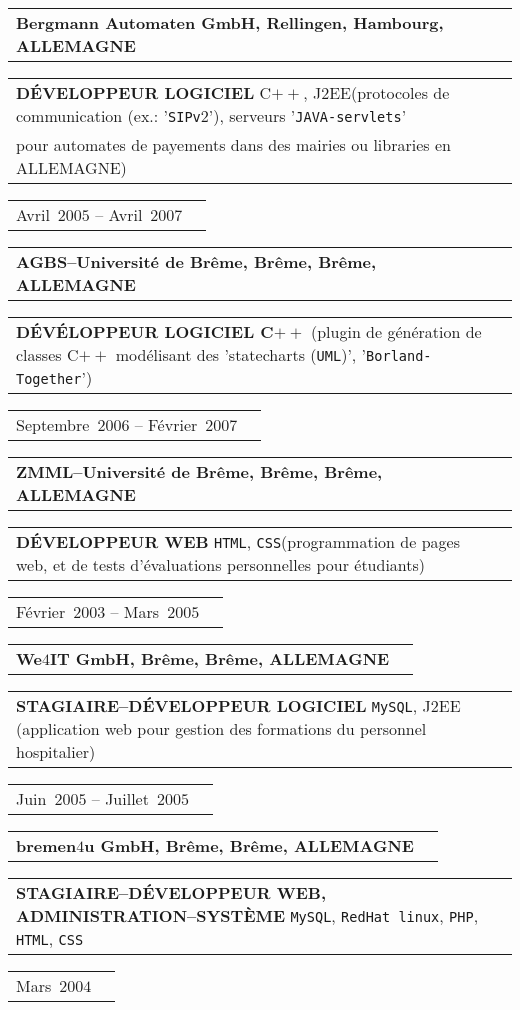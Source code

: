 \documentclass[9pt,a4paper]{article} %
\makeatletter
\newcommand{\headerrow}[2]
{\begin{tabular*}{\linewidth}{l@{\extracolsep{\fill}}r}
	#1 &
	#2 \\
\end{tabular*}}
\newcommand{\headerrowONE}[1]{\headerrow{#1}{}}
\newcommand{\cplusplus}{C$++$\xspace}
\newcommand{\jtwoee}{J$2$EE\xspace}
\newcommand{\css}{\texttt{CSS}\xspace}
\newcommand{\php}{\texttt{PHP}\xspace}
\newcommand{\redhat}{\texttt{RedHat~linux}\xspace}
\newcommand{\mysql}{\texttt{MySQL}\xspace}
\newcommand{\html}{\texttt{HTML}\xspace}
\newcommand{\cvitemdate}[2]{#1~$#2$\xspace}
\newcommand{\cvitempositionheld}[1]{\textbf{#1}\xspace}
\makeatother
\begin{document}
\vspace{0.3em}

\headerrowONE{\textbf{Bergmann Automaten GmbH, Rellingen, Hambourg, ALLEMAGNE}}	
\headerrowONE{\cvitempositionheld{DÉVELOPPEUR LOGICIEL} \cplusplus, \jtwoee (protocoles de
communication (ex.: '\texttt{SIPv$2$}'), serveurs '\texttt{JAVA-servlets}'\\
 pour automates de payements dans des mairies ou libraries en ALLEMAGNE)}
\headerrowONE{\cvitemdate{Avril}{2005} -- \cvitemdate{Avril}{2007}}	
	
\vspace{0.3em}

\headerrowONE{\textbf{AGBS--Université de Brême, Brême, Brême, ALLEMAGNE}}	
\headerrowONE{\cvitempositionheld{DÉVÉLOPPEUR LOGICIEL \cplusplus} (plugin de 
génération de classes \cplusplus modélisant des 'statecharts (\texttt{UML})', '\texttt{Borland-Together}')}
\headerrowONE{\cvitemdate{Septembre}{2006} -- \cvitemdate{Février}{2007}}	

\vspace{0.3em}

\headerrowONE{\textbf{ZMML--Université de Brême, Brême, Brême, ALLEMAGNE}}	
\headerrowONE{\cvitempositionheld{DÉVELOPPEUR WEB} \html, \css (programmation de pages web,
et de tests d'évaluations personnelles pour étudiants)}
\headerrowONE{\cvitemdate{Février}{2003} -- \cvitemdate{Mars}{2005}}	

\vspace{0.3em}

\headerrowONE{\textbf{We$4$IT GmbH, Brême, Brême, ALLEMAGNE}}	
\headerrowONE{\cvitempositionheld{STAGIAIRE--DÉVELOPPEUR LOGICIEL} \mysql, \jtwoee
(application web pour gestion des formations du personnel hospitalier)}
\headerrowONE{\cvitemdate{Juin}{2005} -- \cvitemdate{Juillet}{2005}}
	
\vspace{0.3em}

\headerrowONE{\textbf{bremen$4$u GmbH, Brême, Brême, ALLEMAGNE}}	
\headerrowONE{\cvitempositionheld{STAGIAIRE--DÉVELOPPEUR WEB, ADMINISTRATION--SYSTÈME} \mysql, \redhat, \php,
\html, \css}
\headerrowONE{\cvitemdate{Mars}{2004}}	

\vspace{2em}

\newpage


\vspace{0em}
\end{document}
